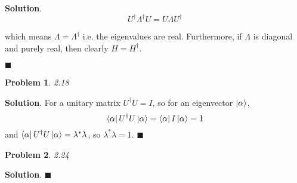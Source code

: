 \documentclass[12pt]{article}
\newtheorem{p}{Problem}
\theoremstyle{definition}
\newenvironment{s}{%
        \begin{trivlist} \item \textbf{Solution}. }{%
            \hspace*{\fill} $\blacksquare$\end{trivlist}}%
\begin{document}
{\begin{s}
\begin{equation*}
U^{\dagger}\Lambda^{\dagger} U = U\Lambda U^{\dagger}
\end{equation*}

which means $\Lambda = \Lambda^{\dagger}$ i.e. the eigenvalues are real. Furthermore, if $\Lambda$ is diagonal and purely real, then clearly $H = H^{\dagger}$.

\end{s}
\begin{p}
2.18
\end{p}

\begin{s}
For a unitary matrix $U^{\dagger}U = I$, so for an eigenvector $\ket{\alpha}$,
\begin{equation*}
\bra{\alpha}U^{\dagger}U\ket{\alpha} = \bra{\alpha}I\ket{\alpha} = 1
\end{equation*}
and $\bra{\alpha}U^{\dagger}U\ket{\alpha} = \lambda^{*}\lambda$, so $\lambda^{*}\lambda = 1$.
\end{s}

\begin{p}
2.24
\end{p}

\begin{s}
\end{s}
\end{document}
